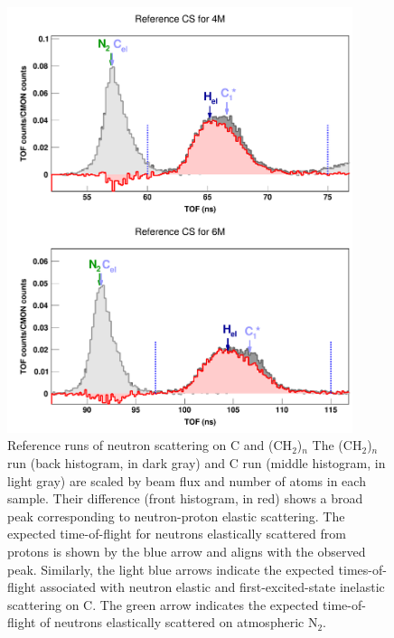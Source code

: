 \begin{figure}[tb]
    \centering
    \includegraphics[width = 0.9\textwidth]{figures/ECSReferenceRuns.png}
    \caption[Reference runs of neutron scattering on C and (CH$_{2}$)$_{n}$]
    {
        Reference runs of neutron scattering on C and (CH$_{2}$)$_{n}$
        The (CH$_{2}$)$_{n}$ run (back histogram, in dark gray) and C run
        (middle histogram, in light gray) are scaled by beam flux and number of
        atoms in each sample. Their difference (front histogram, in red) shows a
        broad peak corresponding to neutron-proton elastic scattering. The
        expected time-of-flight for neutrons elastically scattered from protons
        is shown by the blue arrow and aligns with the observed peak. Similarly,
        the light blue arrows 
        indicate the expected times-of-flight associated with neutron elastic and
        first-excited-state inelastic scattering on C.
        The green arrow indicates the expected time-of-flight of 
        neutrons elastically scattered on atmospheric N$_{2}$.
    }
    \label{ECSReferenceRuns}
\end{figure}

